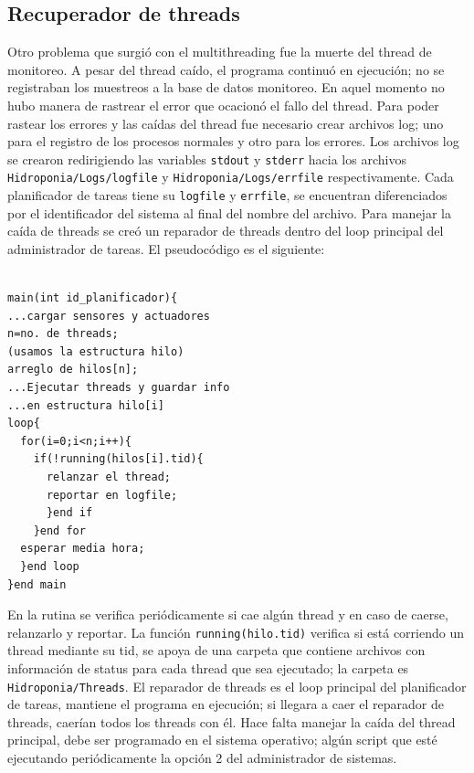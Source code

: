 \documentclass[10pt,twocolumn]{article}
\begin{document}
\subsection{Recuperador de threads}
Otro problema que surgi\'o con el multithreading fue la muerte del thread de monitoreo. A pesar del thread ca\'ido, el programa continu\'o en ejecuci\'on; no se registraban 
los muestreos a la base de datos monitoreo. En aquel momento no hubo manera de rastrear el error que ocacion\'o el fallo del thread. Para poder rastear los errores y las 
ca\'idas del thread fue necesario crear archivos log; uno para el registro de los procesos normales y otro para los errores. Los archivos log se crearon 
redirigiendo las variables \verb|stdout| y \verb|stderr| hacia los archivos \verb|Hidroponia/Logs/logfile| y \verb|Hidroponia/Logs/errfile| respectivamente. Cada 
planificador de tareas tiene su \verb|logfile| y \verb|errfile|, se encuentran diferenciados por el identificador del sistema al final del nombre del archivo. Para manejar 
la 
ca\'ida de threads se cre\'o un 
reparador de threads dentro del loop principal del administrador de tareas. El pseudoc\'odigo es el siguiente:

\begin{verbatim}

main(int id_planificador){
...cargar sensores y actuadores
n=no. de threads;
(usamos la estructura hilo)
arreglo de hilos[n];
...Ejecutar threads y guardar info 
...en estructura hilo[i]
loop{
  for(i=0;i<n;i++){
    if(!running(hilos[i].tid){
      relanzar el thread;
      reportar en logfile;
      }end if
    }end for
  esperar media hora;
  }end loop
}end main
\end{verbatim}

En la rutina se verifica peri\'odicamente si cae alg\'un thread y en caso de caerse, relanzarlo y reportar. La funci\'on \verb|running(hilo.tid)| verifica si est\'a 
corriendo un thread mediante su tid, se apoya de una carpeta que contiene archivos con informaci\'on de status para cada thread que sea ejecutado; la carpeta es 
\verb|Hidroponia/Threads|. 
El reparador de threads 
es el loop principal del planificador de 
tareas, mantiene el programa en ejecuci\'on; si llegara a caer el reparador de threads, caer\'ian todos los threads con \'el. Hace falta manejar la ca\'ida del thread 
principal, debe ser programado en el sistema operativo; alg\'un script que est\'e ejecutando peri\'odicamente la opci\'on 2 del administrador de sistemas.
\end{document}
